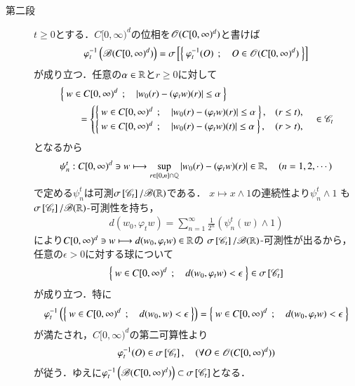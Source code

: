 \begin{prf}
\begin{description}
		\item[第二段]
			$t \geq 0$とする．$C[0,\infty)^d$の位相を$\mathscr{O}(C[0,\infty)^d)$と書けば
			\begin{align}
				\varphi_t^{-1}\left( \mathscr{B}(C[0,\infty)^d) \right)
				= \sigma \left[\left\{\ \varphi_t^{-1}(O)\ \, ; \quad O \in \mathscr{O}(C[0,\infty)^d)\ \right\}\right]
			\end{align}
			が成り立つ．任意の$\alpha \in \mathbb{R}$と$r \geq 0$に対して
			\begin{align}
				&\left\{\ w \in C[0,\infty)^d\ \, ; \quad |w_0(r) - (\varphi_t w)(r)| \leq \alpha\ \right\} \\
				&\qquad = \begin{cases}
					\left\{\ w \in C[0,\infty)^d\ \, ; \quad |w_0(r) - (\varphi_t w)(r)| \leq \alpha\ \right\}, & (r \leq t), \\
					\left\{\ w \in C[0,\infty)^d\ \, ; \quad |w_0(r) - (\varphi_t w)(t)| \leq \alpha\ \right\}, & (r > t),
				\end{cases}
				\quad \in \mathscr{C}_t
			\end{align}
			となるから
			\begin{align}
				\psi^t_n : C[0,\infty)^d \ni w \longmapsto \operatorname*{sup}_{r \in [0,n]\cap\mathbb{Q}} |w_0(r) - (\varphi_t w)(r)| \in \mathbb{R}, \quad (n = 1,2,\cdots)
			\end{align}
			で定める$\psi^t_n$は可測$\sigma \left[\mathscr{C}_t\right]/\mathscr{B}(\mathbb{R})$である．
			$x \longmapsto x \wedge 1$の連続性より$\psi^t_n \wedge 1$
			も$\sigma \left[\mathscr{C}_t\right]/\mathscr{B}(\mathbb{R})$-可測性を持ち，
			\begin{align}
				d(w_0,\varphi_t w) = \sum_{n=1}^{\infty}\frac{1}{2^n} \left( \psi^t_n(w) \wedge 1 \right)
			\end{align}
			により$C[0,\infty)^d \ni w \longmapsto d(w_0,\varphi_t w) \in \mathbb{R}$の
			$\sigma \left[\mathscr{C}_t\right]/\mathscr{B}(\mathbb{R})$-可測性が出るから，任意の$\epsilon > 0$に対する球について
			\begin{align}
				\left\{\ w \in C[0,\infty)^d\ \, ; \quad d(w_0,\varphi_t w) < \epsilon\ \right\} \in \sigma \left[\mathscr{C}_t\right]
			\end{align}
			が成り立つ．特に
			\begin{align}
				\varphi_t^{-1}\left( \left\{\ w \in C[0,\infty)^d\ \, ; \quad d(w_0,w) < \epsilon\ \right\} \right)
				= \left\{\ w \in C[0,\infty)^d\ \, ; \quad d(w_0,\varphi_t w) < \epsilon\ \right\}
			\end{align}
			が満たされ，$C[0,\infty)^d$の第二可算性より
			\begin{align}
				\varphi_t^{-1}(O) \in \sigma \left[\mathscr{C}_t\right],
				\quad (\forall O \in \mathscr{O}(C[0,\infty)^d))
			\end{align}
			が従う．ゆえに$\varphi_t^{-1}\left( \mathscr{B}(C[0,\infty)^d) \right) \subset \sigma \left[\mathscr{C}_t\right]$となる．
			\QED
	\end{description}
\end{prf}

